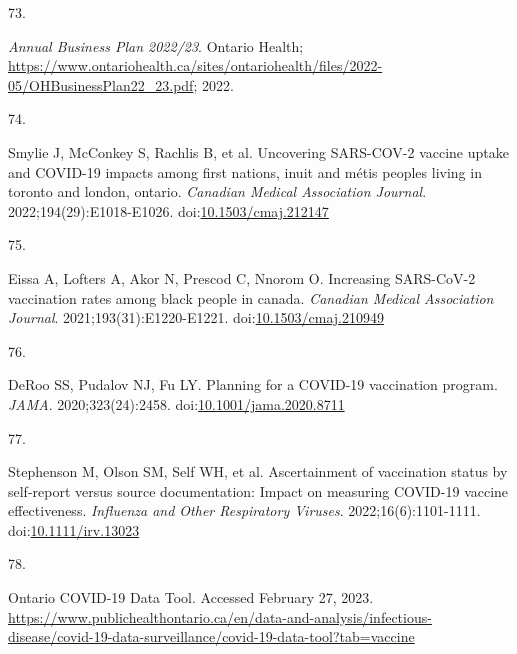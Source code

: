 \documentclass[
]{article}
\newlength{\cslhangindent}
\newlength{\csllabelwidth}
\newlength{\cslentryspacingunit} %
\newenvironment{CSLReferences}[2] %
 {%
  \setlength{\parindent}{0pt}
  \ifodd #1
  \let\oldpar\par
  \def\par{\hangindent=\cslhangindent\oldpar}
  \fi
  \setlength{\parskip}{#2\cslentryspacingunit}
 }%
 {}
\newcommand{\CSLLeftMargin}[1]{\parbox[t]{\csllabelwidth}{#1}}
\newcommand{\CSLRightInline}[1]{\parbox[t]{\linewidth - \csllabelwidth}{#1}\break}
\begin{document}
\begin{CSLReferences}{0}{0}
\leavevmode{}%
\CSLLeftMargin{73. }%
\CSLRightInline{\emph{{A}nnual {B}usiness {P}lan 2022/23}. Ontario
Health;
\url{https://www.ontariohealth.ca/sites/ontariohealth/files/2022-05/OHBusinessPlan22_23.pdf};
2022.}

\leavevmode{}%
\CSLLeftMargin{74. }%
\CSLRightInline{Smylie J, McConkey S, Rachlis B, et al. Uncovering
{SARS}-{COV}-2 vaccine uptake and {COVID}-19 impacts among first
nations, inuit and m{é}tis peoples living in toronto and london,
ontario. \emph{Canadian Medical Association Journal}.
2022;194(29):E1018-E1026.
doi:\href{https://doi.org/10.1503/cmaj.212147}{10.1503/cmaj.212147}}

\leavevmode{}%
\CSLLeftMargin{75. }%
\CSLRightInline{Eissa A, Lofters A, Akor N, Prescod C, Nnorom O.
Increasing {SARS}-{CoV}-2 vaccination rates among black people in
canada. \emph{Canadian Medical Association Journal}.
2021;193(31):E1220-E1221.
doi:\href{https://doi.org/10.1503/cmaj.210949}{10.1503/cmaj.210949}}

\leavevmode{}%
\CSLLeftMargin{76. }%
\CSLRightInline{DeRoo SS, Pudalov NJ, Fu LY. Planning for a {COVID}-19
vaccination program. \emph{{JAMA}}. 2020;323(24):2458.
doi:\href{https://doi.org/10.1001/jama.2020.8711}{10.1001/jama.2020.8711}}

\leavevmode{}%
\CSLLeftMargin{77. }%
\CSLRightInline{Stephenson M, Olson SM, Self WH, et al. Ascertainment of
vaccination status by self-report versus source documentation: Impact on
measuring {COVID}-19 vaccine effectiveness. \emph{Influenza and Other
Respiratory Viruses}. 2022;16(6):1101-1111.
doi:\href{https://doi.org/10.1111/irv.13023}{10.1111/irv.13023}}

\leavevmode{}%
\CSLLeftMargin{78. }%
\CSLRightInline{{Ontario COVID-19 Data Tool}. Accessed February 27,
2023.
\url{https://www.publichealthontario.ca/en/data-and-analysis/infectious-disease/covid-19-data-surveillance/covid-19-data-tool?tab=vaccine}}

\end{CSLReferences}
\end{document}
